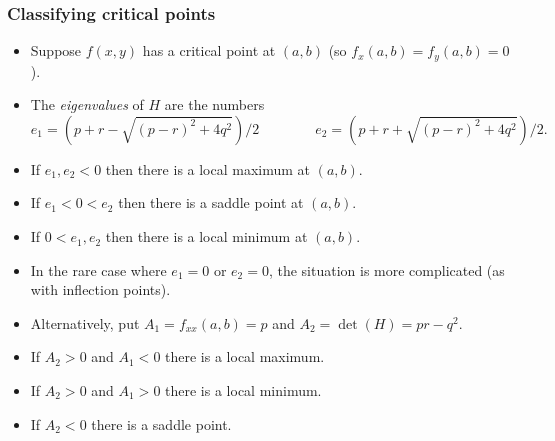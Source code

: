 \documentclass[9pt]{beamer}
\begin{document}
\begin{frame}[t]
 \frametitle{Classifying critical points}
 \begin{itemize}
  \item<1-> Suppose $f(x,y)$ has a critical point at $(a,b)$ (so
   $f_x(a,b)=f_y(a,b)=0$).  
  \item<4-> The \emph{eigenvalues} of $H$ are the numbers
   \[ e_1 = (p+r-\sqrt{(p-r)^2+4q^2})/2 \hspace{4em}
      e_2 = (p+r+\sqrt{(p-r)^2+4q^2})/2.
   \]
  \item<5-> If $e_1,e_2<0$ then there is a local maximum at $(a,b)$.
  \item<6-> If $e_1<0<e_2$ then there is a saddle point at $(a,b)$.
  \item<7-> If $0<e_1,e_2$ then there is a local minimum at $(a,b)$.
  \item<8-> In the rare case where $e_1=0$ or $e_2=0$, the situation
   is more complicated (as with inflection points).
  \item<9-> Alternatively, put $A_1=f_{xx}(a,b)=p$ and
   $A_2=\det(H)=pr-q^2$.
  \item<10-> If $A_2>0$ and $A_1<0$ there is a local maximum.
  \item<11-> If $A_2>0$ and $A_1>0$ there is a local minimum.
  \item<12-> If $A_2<0$ there is a saddle point.
 \end{itemize}
\end{frame}
\end{document}

